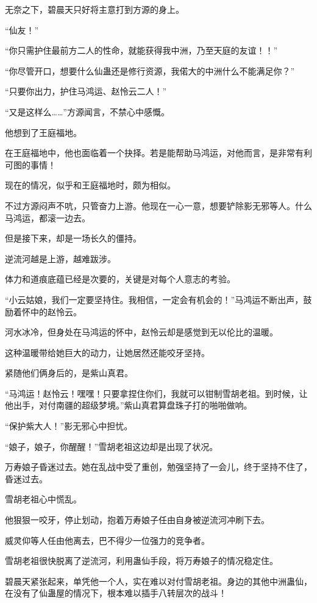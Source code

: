 \begin{this_body}
无奈之下，碧晨天只好将主意打到方源的身上。

“仙友！”

“你只需护住最前方二人的性命，就能获得我中洲，乃至天庭的友谊！！”

“你尽管开口，想要什么仙蛊还是修行资源，我偌大的中洲什么不能满足你？”

“只要你出力，护住马鸿运、赵怜云二人！”

“又是这样么……”方源闻言，不禁心中感慨。

他想到了王庭福地。

在王庭福地中，他也面临着一个抉择。若是能帮助马鸿运，对他而言，是非常有利可图的事情！

现在的情况，似乎和王庭福地时，颇为相似。

不过方源闷声不吭，只管奋力上游。他现在一心一意，想要铲除影无邪等人。什么马鸿运，都滚一边去。

但是接下来，却是一场长久的僵持。

逆流河越是上游，越难跋涉。

体力和道痕底蕴已经是次要的，关键是对每个人意志的考验。

“小云姑娘，我们一定要坚持住。我相信，一定会有机会的！”马鸿运不断出声，鼓励着怀中的赵怜云。

河水冰冷，但身处在马鸿运的怀中，赵怜云却是感觉到无以伦比的温暖。

这种温暖带给她巨大的动力，让她居然还能咬牙坚持。

紧随他们俩身后的，是紫山真君。

“马鸿运！赵怜云！嘿嘿！只要拿捏住你们，我就可以钳制雪胡老祖。到时候，让他出手，对付南疆的超级梦境。”紫山真君算盘珠子打的啪啪做响。

“保护紫大人！”影无邪心中担忧。

“娘子，娘子，你醒醒！”雪胡老祖这边却是出现了状况。

万寿娘子昏迷过去。她在乱战中受了重创，勉强坚持了一会儿，终于坚持不住了，昏迷过去。

雪胡老祖心中慌乱。

他狠狠一咬牙，停止划动，抱着万寿娘子任由自身被逆流河冲刷下去。

威灵仰等人任由他离去，巴不得少一位强力的竞争者。

雪胡老祖很快脱离了逆流河，利用蛊仙手段，将万寿娘子的情况稳定住。

碧晨天紧张起来，单凭他一个人，实在难以对付雪胡老祖。身边的其他中洲蛊仙，在没有了仙蛊屋的情况下，根本难以插手八转层次的战斗！


\end{this_body}
